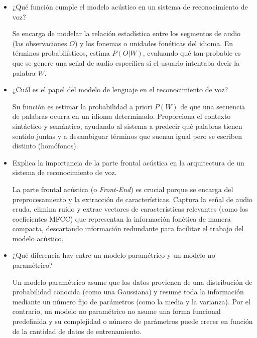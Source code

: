 \documentclass[12pt]{article}
\begin{document}
\begin{itemize}
		Dado que calcular $P(W | O)$ directamente es complejo, el teorema de Bayes permite reescribir el problema como $P(W | O) = \frac{P(O | W) P(W)}{P(O)}$. Como $P(O)$ es igual para todas las secuencias candidatas, el sistema solo necesita maximizar el producto de $P(O | W)$ (proporcionado por el modelo acústico) y $P(W)$ (proporcionado por el modelo de lenguaje).
		
		\item ¿Qué función cumple el modelo acústico en un sistema de reconocimiento de voz?
		
		Se encarga de modelar la relación estadística entre los segmentos de audio (las observaciones $O$) y los fonemas o unidades fonéticas del idioma. En términos probabilísticos, estima $P(O | W)$, evaluando qué tan probable es que se genere una señal de audio específica si el usuario intentaba decir la palabra $W$.
		
		\item ¿Cuál es el papel del modelo de lenguaje en el reconocimiento de voz?
		
		Su función es estimar la probabilidad a priori $P(W)$ de que una secuencia de palabras ocurra en un idioma determinado. Proporciona el contexto sintáctico y semántico, ayudando al sistema a predecir qué palabras tienen sentido juntas y a desambiguar términos que suenan igual pero se escriben distinto (homófonos).
		
		\item Explica la importancia de la parte frontal acústica en la arquitectura de un sistema de reconocimiento de voz.
		
		La parte frontal acústica (o \textit{Front-End}) es crucial porque se encarga del preprocesamiento y la extracción de características. Captura la señal de audio cruda, elimina ruido y extrae vectores de características relevantes (como los coeficientes MFCC) que representan la información fonética de manera compacta, descartando información redundante para facilitar el trabajo del modelo acústico.
		
		\item ¿Qué diferencia hay entre un modelo paramétrico y un modelo no paramétrico?
		
		Un modelo paramétrico asume que los datos provienen de una distribución de probabilidad conocida (como una Gaussiana) y resume toda la información mediante un número fijo de parámetros (como la media y la varianza). Por el contrario, un modelo no paramétrico no asume una forma funcional predefinida y su complejidad o número de parámetros puede crecer en función de la cantidad de datos de entrenamiento.
		

\end{itemize}
\end{document}
